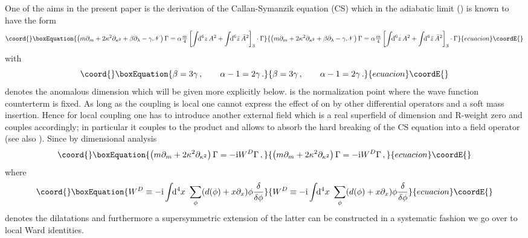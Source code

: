 \documentclass[a4paper,12pt]{article}
\providecommand{\N}{{\mathscr N}}
\providecommand{\I}{{\rm i}}
\def\pr{\partial}
\providecommand{\dx}{\!\!{\rm d}^4x\,\,}
\providecommand{\dS}{\!\!{\rm d}^6z\,}
\providecommand{\dSb}{\!\!{\rm d}^6\bar z\,}
\providecommand{\tfr}[2]{{\textstyle \frac{#1}{#2}}}
\providecommand{\fdq}[2]{\frac{\delta #1}{\delta #2}}
\begin{document}
One of the aims in the present paper is the derivation of the
Callan-Symanzik equation (CS) which in the adiabatic limit
(\myHighlight{$\Lambda=\bar\Lambda=\lambda$}\coordHE{}) is known \cite{CPS,PSbook} to have the
form
\begin{equation}\coord{}\boxEquation{
\left( m\pr_m + 2 \kappa^2 \pr_{\kappa^2} + \beta \pr_\lambda -\gamma \N
\right)\Gamma = \alpha \tfr{m}{4} \left[ \int \dS A^2 + \int \dSb \bar
  A^2\right]_3\cdot \Gamma
\label{CSstandard}
}{
\left( m\pr_m + 2 \kappa^2 \pr_{\kappa^2} + \beta \pr_\lambda -\gamma \N
\right)\Gamma = \alpha \tfr{m}{4} \left[ \int \dS A^2 + \int \dSb \bar
  A^2\right]_3\cdot \Gamma
}{ecuacion}\coordE{}\end{equation}
with
\begin{equation}\coord{}\boxEquation{
\beta=3\gamma\,, \qquad \alpha-1 = 2\gamma\,.
}{
\beta=3\gamma\,, \qquad \alpha-1 = 2\gamma\,.
}{ecuacion}\coordE{}\end{equation}
\myHighlight{$\gamma$}\coordHE{} denotes the anomalous dimension which will be given more
explicitly below. \coordHE{} is the normalization point where the wave
function counterterm is fixed. As long as the coupling \myHighlight{$\Lambda$}\coordHE{} is local
one cannot express the effect of \myHighlight{$m\pr_m + 2\kappa^2 \pr_{\kappa^2}$}\coordHE{} on
\myHighlight{$\Gamma$}\coordHE{} by other differential operators and a soft mass insertion. Hence
for local coupling
one has to introduce another external field \coordHE{} which is a real superfield of
dimension and R-weight zero and couples accordingly;
  in particular it
couples to the product \coordHE{} and allows to absorb the hard breaking of the CS equation into a field operator (see also \cite{KRST01,AGLR98}).  
Since by dimensional analysis 
\begin{equation}\coord{}\boxEquation{
\left( m\pr_m + 2\kappa^2 \pr_{\kappa^2} \right) \Gamma = -\I W^D \Gamma\,,
}{
\left( m\pr_m + 2\kappa^2 \pr_{\kappa^2} \right) \Gamma = -\I W^D \Gamma\,,
}{ecuacion}\coordE{}\end{equation}
where
\begin{equation}\coord{}\boxEquation{
W^D \equiv -\I \int \dx \sum_\phi (d(\phi) + x \pr_x) \phi \fdq{}{\phi}
}{
W^D \equiv -\I \int \dx \sum_\phi (d(\phi) + x \pr_x) \phi \fdq{}{\phi}
}{ecuacion}\coordE{}\end{equation}
denotes the dilatations and furthermore a supersymmetric extension of the
latter can be constructed in a systematic fashion \cite{CPS,PSbook} we go
over to local Ward identities.
\end{document}
